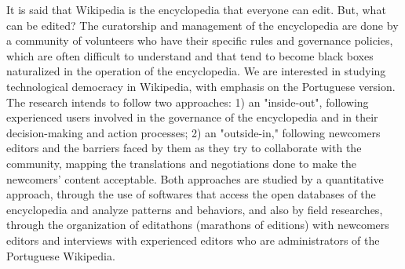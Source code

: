 \begin{foreignabstract}
It is said that Wikipedia is the encyclopedia that everyone can edit. But, what can be edited? The curatorship and management of the encyclopedia are done by a community of volunteers who have their specific rules and governance policies, which are often difficult to understand and that tend to become black boxes naturalized in the operation of the encyclopedia.
We are interested in studying technological democracy in Wikipedia, with emphasis on the Portuguese version. The research intends to follow two approaches: 1) an "inside-out", following experienced users involved in the governance of the encyclopedia and in their decision-making and action processes; 2) an "outside-in," following newcomers editors and the barriers faced by them as they try to collaborate with the community, mapping the translations and negotiations done to make the newcomers' content acceptable.
Both approaches are studied by a quantitative approach, through the use of softwares that access the open databases of the encyclopedia and analyze patterns and behaviors, and also by field researches, through the organization of editathons (marathons of editions) with newcomers editors and interviews with experienced editors who are administrators of the Portuguese Wikipedia.
\end{foreignabstract}

